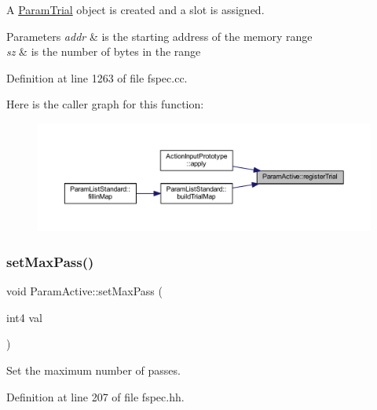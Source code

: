 A \mbox{\hyperlink{class_param_trial}{Param\+Trial}} object is created and a slot is assigned. 
\begin{DoxyParams}{Parameters}
{\em addr} & is the starting address of the memory range \\
\hline
{\em sz} & is the number of bytes in the range \\
\hline
\end{DoxyParams}


Definition at line 1263 of file fspec.\+cc.

Here is the caller graph for this function\+:
\nopagebreak
\begin{figure}[H]
\begin{center}
\leavevmode
\includegraphics[width=350pt]{class_param_active_a43a357162f55b3b8f7e13a013ad207b5_icgraph}
\end{center}
\end{figure}
\mbox{\label{class_param_active_ad4a9012547b34e47de3645ad5e062f4f}} 
\subsubsection{\texorpdfstring{setMaxPass()}{setMaxPass()}}
{\footnotesize\ttfamily void Param\+Active\+::set\+Max\+Pass (\begin{DoxyParamCaption}\item[{int4}]{val }\end{DoxyParamCaption})\hspace{0.3cm}{\ttfamily [inline]}}



Set the maximum number of passes. 



Definition at line 207 of file fspec.\+hh.

